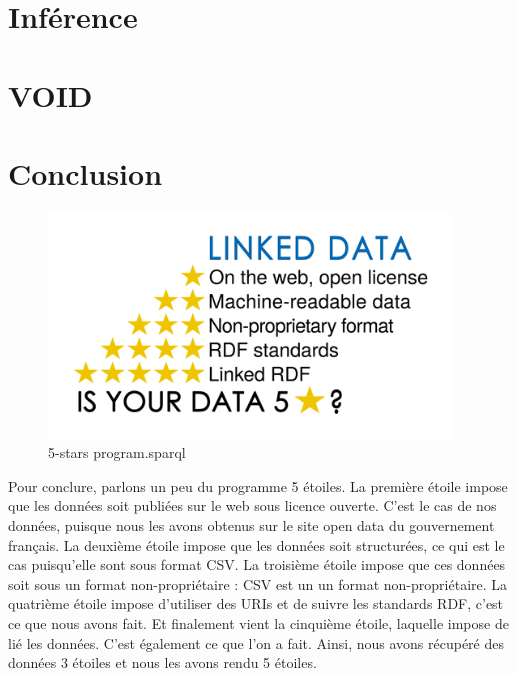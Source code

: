 \documentclass[a4paper,sffamily,12pt]{article}
\begin{document}
			\vspace{0.5cm}			

	\section{Inférence}

		\vspace{0.5cm}
		
		

		\vspace{0.5cm}
				
	\section{VOID}

		\vspace{0.5cm}	
		
				
				
		\vspace{0.5cm}
				
	\section{Conclusion}

		\vspace{0.5cm}			

		\begin{figure}[!h]
			
			\centerline{\includegraphics[height=6cm]{picture/linked_data.png}}
			\caption{5-stars program.sparql}
			\label{5stars}
			
		\end{figure}		
	
		\vspace{1cm}
		
		Pour conclure, parlons un peu du programme 5 étoiles. La première étoile impose que les données soit publiées sur le web sous licence ouverte. C'est le cas de nos données, puisque nous les avons obtenus sur le site open data du gouvernement français. La deuxième étoile impose que les données soit structurées, ce qui est le cas puisqu'elle sont sous format CSV. La troisième étoile impose que ces données soit sous un format non-propriétaire : CSV est un un format non-propriétaire. La quatrième étoile impose d'utiliser des URIs et de suivre les standards RDF, c'est ce que nous avons fait. Et finalement vient la cinquième étoile, laquelle impose de lié les données. C'est également ce que l'on a fait. Ainsi, nous avons récupéré des données 3 étoiles et nous les avons rendu 5 étoiles.
\end{document}

